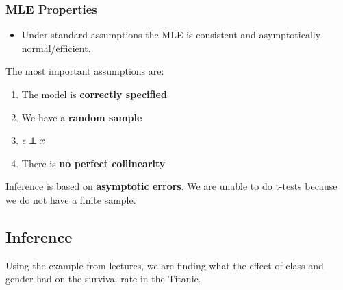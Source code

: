 \documentclass[11pt]{article}
\begin{document}
\begin{shaded}
\subsubsection{MLE Properties}
\begin{itemize}
    \item Under standard assumptions the MLE is consistent and asymptotically normal/efficient.
\end{itemize}

The most important assumptions are:
\begin{enumerate}
    \item The model is \textbf{correctly specified}
    \item We have a \textbf{random sample}
    \item $\epsilon \indep x$
    \item There is \textbf{no perfect collinearity}
\end{enumerate}

Inference is based on \textbf{asymptotic errors}. We are unable to do t-tests because we do not have a finite sample.
\end{shaded}

\subsection{Inference}

Using the example from lectures, we are finding what the effect of class and gender had on the survival rate in the Titanic.
\end{document}

